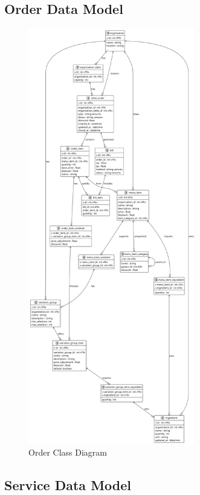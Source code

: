 \documentclass[]{VUMIFTemplateClass}
\begin{document}
\subsection{Order Data Model}
\begin{figure}[H]
    \centering
    \includegraphics[width=0.65\textwidth]{images/diagrams/orders/order_model_class.png}
    \caption{Order Class Diagram}
    \label{fig:order_class_diagram}
\end{figure}

\subsection{Service Data Model}
\end{document}
